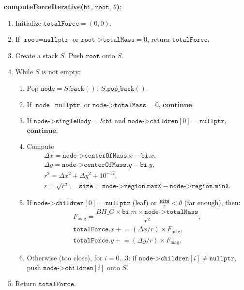 \documentclass{article}
\begin{document}
\vspace{1ex}
\noindent\textbf{computeForceIterative(\(\texttt{bi},\,\texttt{root},\,\theta\))}: 
\begin{enumerate}
  \item Initialize \(\texttt{totalForce} = (0,0).\)
  \item If \(\texttt{root} = \texttt{nullptr}\) or \(\texttt{root->totalMass} = 0\), return \(\texttt{totalForce}.\)
  \item Create a stack \(S\). Push \(\texttt{root}\) onto \(S\).
  \item While \(S\) is not empty:
    \begin{enumerate}
      \item Pop \(\texttt{node} = S.\texttt{back}();\; S.\texttt{pop\_back}().\)
      \item If \(\texttt{node} = \texttt{nullptr}\) or \(\texttt{node->totalMass} = 0\), \(\textbf{continue}\).
      \item If \(\texttt{node->singleBody} = \&\texttt{bi}\) and 
        \(\texttt{node->children}[0] = \texttt{nullptr}\), \(\textbf{continue}\).
      \item Compute 
      \[
      \begin{array}{l}
        \Delta x = \texttt{node->centerOfMass}.x - \texttt{bi}.x,\\
        \Delta y = \texttt{node->centerOfMass}.y - \texttt{bi}.y,\\
        r^2 = \Delta x^2 + \Delta y^2 + 10^{-12},\\
        r = \sqrt{r^2},\quad
        \texttt{size} = \texttt{node->region.maxX} - \texttt{node->region.minX}.
      \end{array}
      \]
      \item If \(\texttt{node->children}[0] = \texttt{nullptr}\) (leaf) or 
        \(\tfrac{\texttt{size}}{r} < \theta\) (far enough), then:
        \[
        \begin{array}{l}
          F_{\mathrm{mag}} = \dfrac{BH\_G \times \texttt{bi}.m \times \texttt{node->totalMass}}{r^2},\\
          \texttt{totalForce}.x \mathrel{+}= (\Delta x / r)\times F_{\mathrm{mag}},\\
          \texttt{totalForce}.y \mathrel{+}= (\Delta y / r)\times F_{\mathrm{mag}}.
        \end{array}
        \]
      \item Otherwise (too close), for \(i=0\ldots3\):
        if \(\texttt{node->children}[i]\neq\texttt{nullptr}\), push 
        \(\texttt{node->children}[i]\) onto \(S\).
    \end{enumerate}
  \item Return \(\texttt{totalForce}.\)
\end{enumerate}
\end{document}
